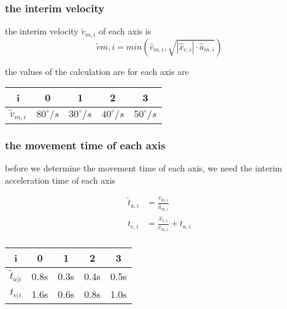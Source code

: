 \documentclass[%
  professionalfonts,%
  xcolor={%
    usenames,%
    dvipsnames,%
    svgnames,%
    table,%
    hyperref%
  }%
]{beamer}
\begin{document}
\subsubsection*{the interim velocity}
\begin{frame}
the interim velocity $\tilde{v}_{m,i}$ of each axis is 
\begin{equation*}
\tilde{v}{m,i} = min\left(\hat{v}_{m,i},\sqrt{|\hat{x}_{e,i}| \cdot \hat{a}_{m,i}} \right) 
\end{equation*}

the values of the calculation are for each axis are
\begin{center}
\begin{tabular}{ccccc}
\toprule
i & 0 & 1 & 2 & 3 \\
\midrule
$\tilde{v}_{m,i}$ & $80^\circ/s$ & $30^\circ/s$ & $40^\circ/s$ & $50^\circ/s$ \\
\bottomrule
\end{tabular}               
\end{center}  
\end{frame}

\subsubsection*{the movement time of each axis}
\begin{frame}
before we determine the movement time of each axis, we need the interim acceleration time of each axis

\begin{align}
\tilde{t}_{a,i} & = \frac{v_{m,i}}{\hat{a}_{m,i}} \\
t_{e,i} & = \frac{\hat{x}_{e,i}}{v_{m,i}} + t_{a,i} \\
\end{align}

\begin{center}
\begin{tabular}{ccccc}
\toprule
i & 0 & 1 & 2 & 3 \\
\midrule
$\tilde{t}_{a|i}$ & 0.8s & 0.3s & 0.4s & 0.5s \\ 
$t_{e|i}$ & 1.6s & 0.6s & 0.8s & 1.0s \\
\bottomrule 
\end{tabular}
\end{center} 
\end{frame}
\end{document}
